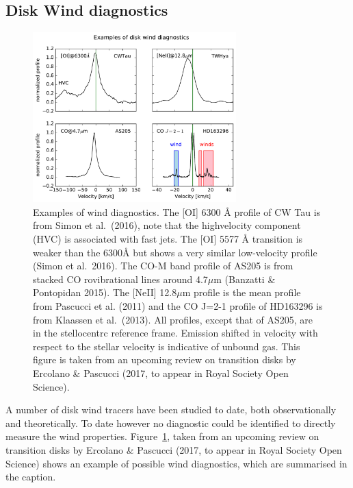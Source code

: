 \documentclass[10pt,fleqn,twoside]{article}
\begin{document}
\subsection{Disk Wind diagnostics}
 \begin{figure}
   \centering
   \includegraphics[width=0.7\textwidth]{winds.pdf}

   \caption{Examples of wind diagnostics. The [OI] 6300 Å profile of CW Tau is from Simon et al.\ (2016), note that the highvelocity
component (HVC) is associated with fast jets. The [OI] 5577 Å transition is weaker than the 6300Å but shows a
very similar low-velocity profile (Simon et al.\ 2016). The CO-M band profile of AS205 is from stacked CO rovibrational
lines around 4.7$\mu$m (Banzatti \& Pontopidan 2015). The [NeII] 12.8$\mu$m profile is the mean profile from Pascucci et al.
(2011) and the CO J=2-1 profile of HD163296 is from Klaassen et al.\ (2013). All profiles, except that of AS205, are in
the stellocentrc reference frame. Emission shifted in velocity with respect to the stellar velocity is indicative of unbound
gas. 
This figure is
taken from an upcoming review on transition disks by Ercolano \& Pascucci (2017, to appear in Royal
Society Open Science).}
              \label{fig:lines}%
    \end{figure}

A number of disk wind tracers have been studied to date, both
observationally and theoretically. To date however no diagnostic could
be identified to directly measure the wind properties. 
Figure~\ref{fig:lines}, taken from an upcoming review on transition disks by
Ercolano \& Pascucci (2017, to appear in Royal Society Open Science)
shows an example of possible wind diagnostics, which are summarised in
the caption.  
\end{document}
